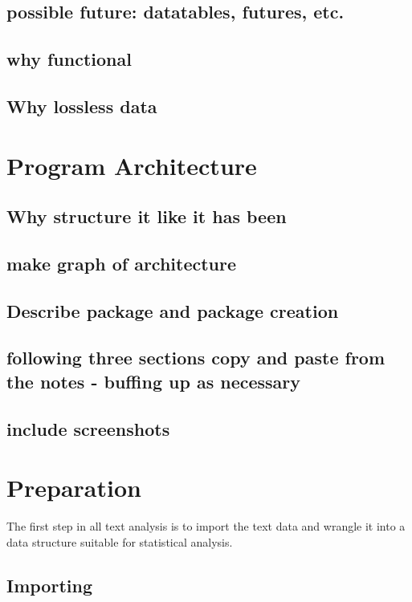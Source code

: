 \documentclass[11pt, a4paper, oneside]{report}
\begin{document}
\subsection{possible future: datatables, futures, etc.}
\subsection{why functional}
\subsection{Why lossless data}

\section{Program Architecture}
\label{sec:program-architecture-1}

\subsection{Why structure it like it has been}
\subsection{make graph of architecture}
\subsection{Describe package and package creation}
\subsection{following three sections copy and paste from the notes - buffing up as necessary}
\subsection{include screenshots}

\section{Preparation}
\label{sec:import}
The first step in all text analysis is to import the text data and
wrangle it into a data structure suitable for statistical analysis.

\subsection{Importing}
\label{sec:importing}
\end{document}
